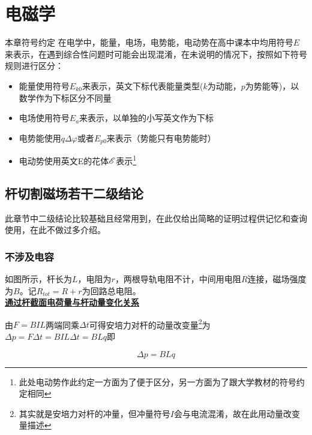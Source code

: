 
\chapter{电磁学}

\begin{mk}{本章符号约定}{}
在电学中，能量，电场，电势能，电动势在高中课本中均用符号$E$来表示，在遇到综合性问题时可能会出现混淆，在未说明的情况下，按照如下符号规则进行区分：

\begin{itemize}
\item 能量使用符号$E_{k0}$来表示，英文下标代表能量类型($k$为动能，$p$为势能等)，以数学作为下标区分不同量
\item 电场使用符号$E_a$来表示，以单独的小写英文作为下标
\item 电势能使用$q \Delta \varphi$或者$E_{p0}$来表示（势能只有电势能时）
\item 电动势使用英文E的花体$\mathscr{E}$表示\footnote{此处电动势作此约定一方面为了便于区分，另一方面为了跟大学教材的符号约定相同}
\end{itemize}
\end{mk}

\section{杆切割磁场若干二级结论}

此章节中二级结论比较基础且经常用到，在此仅给出简略的证明过程供记忆和查询使用，在此不做过多介绍。

\subsection{不涉及电容}

如图所示，杆长为$L$，电阻为$r$，两根导轨电阻不计，中间用电阻$R$连接，磁场强度为$B$。记$R_{tot} = R + r$为回路总电阻。
~\\

\noindent \uline{\textbf{通过杆截面电荷量与杆动量变化关系}}

由$F = BIL$两端同乘$\Delta t$可得安培力对杆的动量改变量\footnote{其实就是安培力对杆的冲量，但冲量符号$I$会与电流混淆，故在此用动量改变量描述}为$\Delta p = F \Delta t = BIL \Delta t = BLq$即

\begin{equation}
\boxed{\Delta p = BLq}
\label{e_dhydl}
\end{equation}

